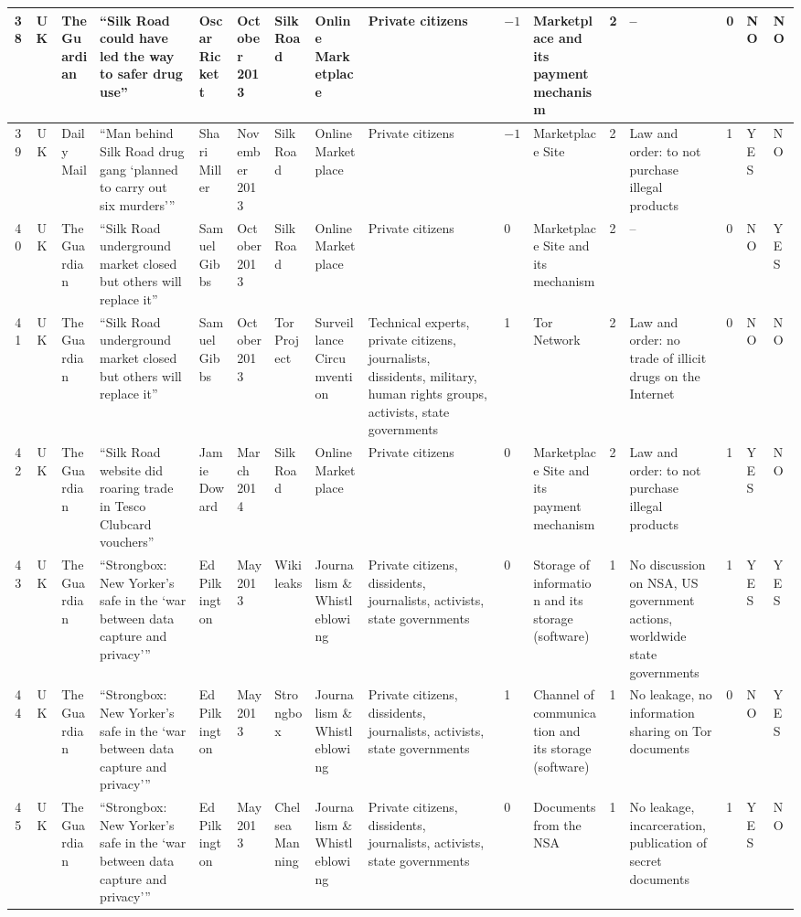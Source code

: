 \begin{landscape}
{\begin{longtable}{|c|c|p{1.2cm}|p{2.5cm}|p{1.4cm}|p{1.2cm}|p{1.4cm}|p{1.2cm}|p{1.8cm}|p{0.4cm}|p{1.8cm}|p{0.4cm}|p{1.5cm}|p{0.4cm}|p{0.6cm}|p{0.6cm}|}
\hline
38 & UK & The Guardian & ``Silk Road could have led the way to safer drug use'' & Oscar Rickett & October 2013 &Silk Road & Online Marketplace & Private citizens & $-1$ & Marketplace and its payment mechanism & 2 & -- & 0 & NO & NO \\
\hline
39 & UK & Daily Mail & ``Man behind Silk Road drug gang `planned to carry out six murders''' & Shari Miller & November 2013 &Silk Road & Online Marketplace & Private citizens & $-1$ & Marketplace Site & 2 & Law and order: to not purchase illegal products & 1 & YES & NO \\
\hline
40 & UK & The Guardian & ``Silk Road underground market closed but others will replace it'' & Samuel Gibbs & October 2013 &Silk Road & Online Marketplace & Private citizens & 0 & Marketplace Site and its mechanism & 2 & -- & 0 & NO & YES \\
\hline
41 & UK & The Guardian & ``Silk Road underground market closed but others will replace it'' & Samuel Gibbs & October 2013 &Tor Project & Surveillance Circumvention & Technical experts, private citizens, journalists, dissidents, military, human rights groups, activists, state governments & 1 & Tor Network & 2 & Law and order: no trade of illicit drugs on the Internet & 0 & NO & NO \\
\hline
42 & UK & The Guardian & ``Silk Road website did roaring trade in Tesco Clubcard vouchers'' & Jamie Doward & March 2014 &Silk Road & Online Marketplace & Private citizens & 0 & Marketplace Site and its payment mechanism & 2 & Law and order: to not purchase illegal products & 1 & YES & NO \\
\hline
43 & UK & The Guardian & ``Strongbox: New Yorker's safe in the `war between data capture and privacy''' & Ed Pilkington & May 2013 &Wikileaks & Journalism \& Whistleblowing & Private citizens, dissidents, journalists, activists, state governments & 0 & Storage of information and its storage (software) & 1 & No discussion on NSA, US government actions, worldwide state governments & 1 & YES & YES \\
\hline
44 & UK & The Guardian & ``Strongbox: New Yorker's safe in the `war between data capture and privacy''' & Ed Pilkington & May 2013 &Strongbox & Journalism \& Whistleblowing & Private citizens, dissidents, journalists, activists, state governments & 1 & Channel of communication and its storage (software) & 1 & No leakage, no information sharing on Tor documents & 0 & NO & YES \\
\hline
45 & UK & The Guardian & ``Strongbox: New Yorker's safe in the `war between data capture and privacy''' & Ed Pilkington & May 2013 &Chelsea Manning & Journalism \& Whistleblowing & Private citizens, dissidents, journalists, activists, state governments & 0 & Documents from the NSA & 1 & No leakage, incarceration, publication of secret documents & 1 & YES & NO \\

\end{longtable}}
\end{landscape}
